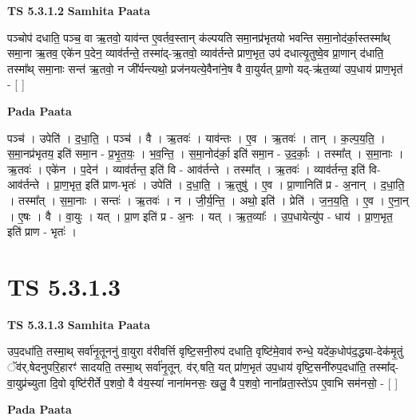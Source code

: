 \documentclass[17pt]{extarticle}
\begin{document}
\textbf{TS 5.3.1.2 } \newline
\textbf{Samhita Paata} \newline

पञ्चोप॑ दधाति॒ पञ्च॒ वा ऋ॒तवो॒ याव॑न्त ए॒वर्तव॒स्तान् क॑ल्पयति समा॒नप्र॑भृतयो भवन्ति समा॒नोद॑र्का॒स्तस्मा᳚थ् समा॒ना ऋ॒तव॒ एके॑न प॒देन॒ व्याव॑र्तन्ते॒ तस्मा॑द्-ऋ॒तवो॒ व्याव॑र्तन्ते प्राण॒भृत॒ उप॑ दधात्यृ॒तुष्वे॒व प्रा॒णान् द॑धाति॒ तस्मा᳚थ् समा॒नाः सन्त॑ ऋ॒तवो॒ न जी᳚र्यन्त्यथो॒ प्रज॑नयत्ये॒वैना॑ने॒ष वै वा॒युर्यत् प्रा॒णो यद्-ऋ॑त॒व्या॑ उप॒धाय॑ प्राण॒भृत॑ - [  ] \newline

\textbf{Pada Paata} \newline

पञ्च॑ । उपेति॑ । द॒धा॒ति॒ । पञ्च॑ । वै । ऋ॒तवः॑ । याव॑न्तः । ए॒व । ऋ॒तवः॑ । तान् । क॒ल्प॒य॒ति॒ । स॒मा॒नप्र॑भृतय॒ इति॑ समा॒न - प्र॒भृ॒त॒यः॒ । भ॒व॒न्ति॒ । स॒मा॒नोद॑र्का॒ इति॑ समा॒न - उ॒द॒र्काः॒ । तस्मा᳚त् । स॒मा॒नाः । ऋ॒तवः॑ । एके॑न । प॒देन॑ । व्याव॑र्तन्त॒ इति॑ वि - आव॑र्तन्ते । तस्मा᳚त् । ऋ॒तवः॑ । व्याव॑र्तन्त॒ इति॑ वि-आव॑र्तन्ते । प्रा॒ण॒भृत॒ इति॑ प्राण-भृतः॑ । उपेति॑ । द॒धा॒ति॒ । ऋ॒तुषु॑ । ए॒व । प्रा॒णानिति॑ प्र - अ॒नान् । द॒धा॒ति॒ । तस्मा᳚त् । स॒मा॒नाः । सन्तः॑ । ऋ॒तवः॑ । न । जी॒र्य॒न्ति॒ । अथो॒ इति॑ । प्रेति॑ । ज॒न॒य॒ति॒ । ए॒व । ए॒ना॒न् । ए॒षः । वै । वा॒युः । यत् । प्रा॒ण इति॑ प्र - अ॒नः । यत् । ऋ॒त॒व्याः᳚ । उ॒प॒धायेत्यु॑प - धाय॑ । प्रा॒ण॒भृत॒ इति॑ प्राण - भृतः॑ ।  \newline





\section{ TS 5.3.1.3 }

\textbf{TS 5.3.1.3 } \newline
\textbf{Samhita Paata} \newline

उप॒दधा॑ति॒ तस्मा॒थ् सर्वा॑नृ॒तूननु॑ वा॒युरा व॑रीवर्त्ति वृष्टि॒सनी॒रुप॑ दधाति॒ वृष्टि॑मे॒वाव॑ रुन्धे॒ यदे॑क॒धोप॑द॒द्ध्या-देक॑मृ॒तुं ॅव॑र्.षेदनुपरि॒हारꣳ॑ सादयति॒ तस्मा॒थ् सर्वा॑नृ॒तून्. व॑र्.षति॒ यत् प्रा॑ण॒भृत॑ उप॒धाय॑ वृष्टि॒सनी॑रुप॒दधा॑ति॒ तस्मा᳚द्-वा॒युप्र॑च्युता दि॒वो वृष्टि॑रीर्ते प॒शवो॒ वै व॑य॒स्या॑ नाना॑मनसः॒ खलु॒ वै प॒शवो॒ नाना᳚व्रता॒स्ते॑ऽप ए॒वाभि सम॑नसो॒ - [  ] \newline

\textbf{Pada Paata} \newline
\end{document}
